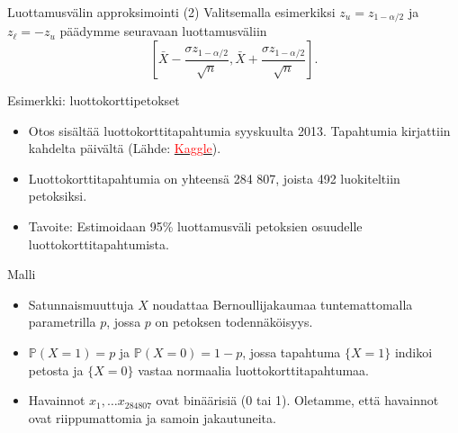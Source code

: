 \documentclass{beamer}
\begin{document}

\begin{frame}{Luottamusvälin approksimointi (2)}
  Valitsemalla esimerkiksi $z_u = z_{1 - \alpha/2}$ ja $z_\ell = -z_u$ päädymme
  seuravaan luottamusväliin
  \begin{equation*}
    \left[\bar X - \frac{\sigma z_{1 - \alpha/2}}{\sqrt{n}},
    \bar X + \frac{\sigma z_{1 - \alpha/2}}{\sqrt{n}}\right].
  \end{equation*}
\end{frame}


\begin{frame}{Esimerkki: luottokorttipetokset}
  \begin{itemize}
    \item Otos sisältää luottokorttitapahtumia syyskuulta 2013. Tapahtumia
    kirjattiin kahdelta päivältä
    (Lähde: \href{https://www.kaggle.com/datasets/mlg-ulb/creditcardfraud?resource=download}{\textcolor{red}{Kaggle}}).
    \pause
    \item Luottokorttitapahtumia on yhteensä 284 807, joista 492 luokiteltiin
    petoksiksi.
    \pause
    \item Tavoite: Estimoidaan 95\% luottamusväli petoksien osuudelle
    luottokorttitapahtumista.
  \end{itemize}
\end{frame}


\begin{frame}{Malli}
  \begin{itemize}
    \item Satunnaismuuttuja $X$ noudattaa Bernoullijakaumaa tuntemattomalla
    parametrilla $p$, jossa $p$ on petoksen todennäköisyys.
    \item $\mathbb{P}\left(X = 1\right) = p$ ja $\mathbb{P}\left(X = 0\right) =
    1 - p$, jossa tapahtuma $\{X = 1\}$ indikoi petosta ja $\{X = 0\}$ vastaa
    normaalia luottokorttitapahtumaa.
    \item Havainnot $x_1, \ldots x_{284807}$ ovat binäärisiä (0 tai 1).
    Oletamme, että havainnot ovat riippumattomia ja samoin jakautuneita.
  \end{itemize}
\end{frame}

\end{document}
